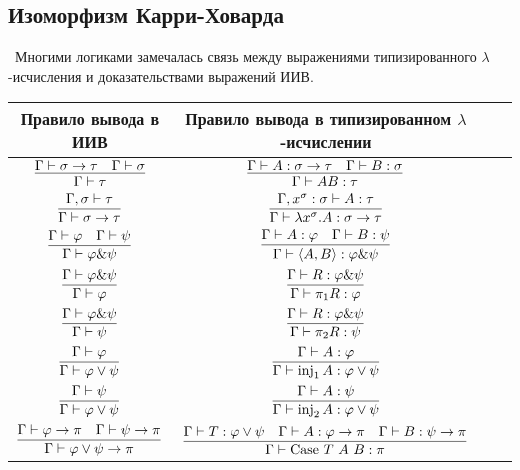 \subsection{\texorpdfstring{Изоморфизм Карри-Ховарда}{Curry-style}}

\todo \ Многими логиками замечалась связь между выражениями типизированного $\lambda$-исчисления и доказательствами выражений ИИВ.

\begin{center}
\begin{tabular}{|Sc|Sc|}
    \hline Правило вывода в ИИВ & Правило вывода в типизированном $\lambda$-исчислении \\ \hline

    $\infer{\Gamma \vdash \tau}{\Gamma \vdash \sigma \rightarrow \tau & \Gamma \vdash \sigma}$ &
    $\infer{\Gamma \vdash AB : \tau}{\Gamma \vdash A : \sigma \rightarrow \tau & \Gamma \vdash B : \sigma}$ \\

    $\infer{\Gamma \vdash \sigma \rightarrow \tau}{\Gamma, \sigma \vdash \tau}$ &
    $\infer{\Gamma \vdash \lambda x^\sigma . A : \sigma \rightarrow \tau}{\Gamma, x^\sigma : \sigma \vdash A : \tau}$ \\ \hline

    $\infer{\Gamma \vdash \varphi \& \psi}{\Gamma \vdash \varphi & \Gamma \vdash \psi}$ &
    $\infer{\Gamma \vdash \left<A,B\right> : \varphi \& \psi}{\Gamma \vdash A : \varphi & \Gamma \vdash B : \psi}$ \\

    $\infer{\Gamma \vdash \varphi}{\Gamma \vdash \varphi \& \psi}$ &
    $\infer{\Gamma \vdash \pi_1 R : \varphi}{\Gamma \vdash R : \varphi \& \psi}$ \\

    $\infer{\Gamma \vdash \psi}{\Gamma \vdash \varphi \& \psi}$ &
    $\infer{\Gamma \vdash \pi_2 R : \psi}{\Gamma \vdash R : \varphi \& \psi}$ \\ \hline

    $\infer{\Gamma \vdash \varphi \vee \psi}{\Gamma \vdash \varphi}$ &
    $\infer{\Gamma \vdash \inj_1 A : \varphi \vee \psi}{\Gamma \vdash A : \varphi}$ \\

    $\infer{\Gamma \vdash \varphi \vee \psi}{\Gamma \vdash \psi}$ &
    $\infer{\Gamma \vdash \inj_2 A : \varphi \vee \psi}{\Gamma \vdash A : \psi}$ \\

    $\infer{\Gamma \vdash \varphi \vee \psi \rightarrow \pi}
        {\Gamma \vdash \varphi \rightarrow \pi & \Gamma \vdash \psi \rightarrow \pi}$ &
    $\infer{\Gamma \vdash \case{T}{A}{B} : \pi}{\Gamma \vdash T : \varphi \vee \psi &
        \Gamma \vdash A : \varphi \rightarrow \pi & \Gamma \vdash B : \psi \rightarrow \pi}$ \\ \hline
\end{tabular}
\end{center}

